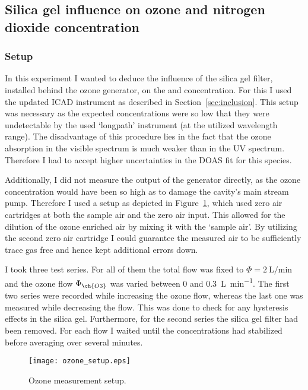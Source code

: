 \subsection{Silica gel influence on ozone and nitrogen dioxide concentration}
\label{sec:silica}

\subsubsection{Setup}
\label{sec:silica-setup}

In this experiment I wanted to deduce the influence of the silica gel
filter, installed behind the ozone generator, on the  and
 concentration. For this I used the updated ICAD instrument as
described in Section~\ref{sec:inclusion}. This setup was necessary as
the expected  concentrations were so low that they were
undetectable by the used `longpath' instrument (at the utilized
wavelength range). The disadvantage of this procedure lies in the fact
that the ozone absorption in the visible spectrum is much weaker than
in the UV spectrum. Therefore I had to accept higher uncertainties in
the DOAS fit for this species.

Additionally, I did not measure the output of the generator directly,
as the ozone concentration would have been so high as to damage the
cavity's main stream pump. Therefore I used a setup as depicted in
Figure~\ref{fig:ozone-flow-setup}, which used zero air cartridges at
both the sample air and the zero air input. This allowed for the
dilution of the ozone enriched air by mixing it with the `sample
air'. By utilizing the second zero air cartridge I could guarantee the
measured air to be sufficiently trace gas free and hence kept
additional errors down.

I took three test series. For all of them the total flow was fixed to
$\Phi = \SI{2}{\liter\per\minute}$ and the ozone flow $\Phi_{\ch{O3}}$
was varied between \num{0} and \SI{0.3}{\liter\per\minute}. The first
two series were recorded while increasing the ozone flow, whereas the
last one was measured while decreasing the flow. This was done to
check for any hysteresis effects in the silica gel. Furthermore, for
the second series the silica gel filter had been removed. For each
flow I waited until the concentrations had stabilized before averaging
over several minutes.

\begin{figure}[htbp]
  \centering
  \texttt{[image: ozone\_setup.eps]}
  \caption{Ozone measurement setup.}
  \label{fig:ozone-flow-setup}
\end{figure}

